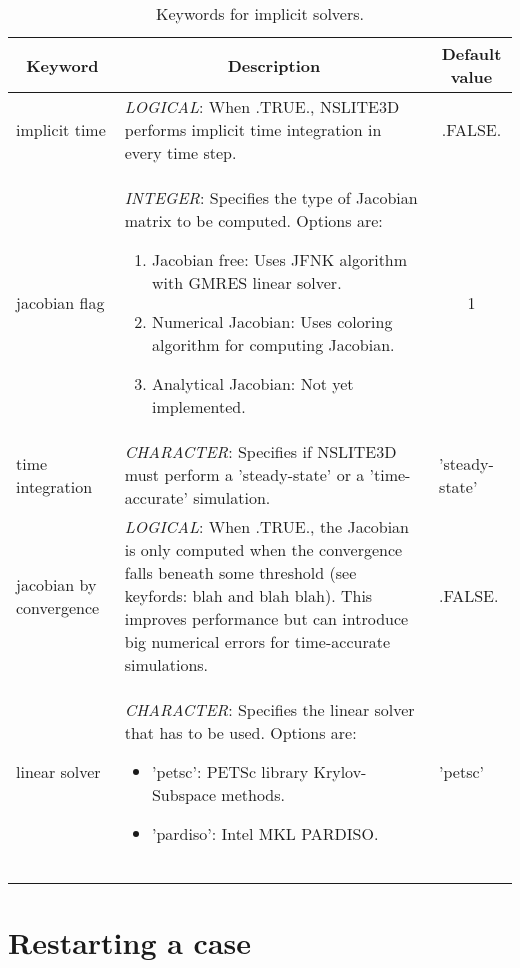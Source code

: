 \documentclass[a4paper,10pt]{report}
\begin{document}
\begin{table}[htbp]
\caption{Keywords for implicit solvers.}
\begin{tabular}{|l|p{10cm}|l|}
\hline
\multicolumn{1}{|c|}{Keyword} & \multicolumn{1}{c|}{Description} & \multicolumn{1}{c|}{Default value} \\ \hline
implicit time & \textit{LOGICAL}: When .TRUE., NSLITE3D performs implicit time integration in every time step. & \multicolumn{1}{c|}{.FALSE.} \\ \hline
jacobian flag           & \textit{INTEGER}: Specifies the type of Jacobian matrix to be computed. Options are:\
				\begin{enumerate}
					\item Jacobian free: Uses JFNK algorithm with GMRES linear solver.
					\item Numerical Jacobian: Uses coloring algorithm for computing Jacobian.
					\item Analytical Jacobian: Not yet implemented.
					\end{enumerate}
										& \multicolumn{1}{c|}{1} \\ \hline
time integration        & \textit{CHARACTER}: Specifies if NSLITE3D must perform a 'steady-state' or a 'time-accurate' simulation. &  'steady-state'\\ \hline
jacobian by convergence & \textit{LOGICAL}: When .TRUE., the Jacobian is only computed when the convergence falls beneath some threshold (see keyfords: blah and blah blah). This improves performance but can introduce big numerical errors for time-accurate simulations.  & .FALSE. \\ \hline
linear solver           & \textit{CHARACTER}: Specifies the linear solver that has to be used. Options are:\ 
				\begin{itemize}
					\item 'petsc': PETSc library Krylov-Subspace methods.
					\item 'pardiso': Intel MKL PARDISO.
				\end{itemize}
										& 'petsc'  \\ \hline
  &  &  \\ \hline
   &  &  \\ \hline
    &  &  \\ \hline
\end{tabular}
\label{tab:implicitkey}
\end{table}


\chapter{Restarting a case}
\end{document}
